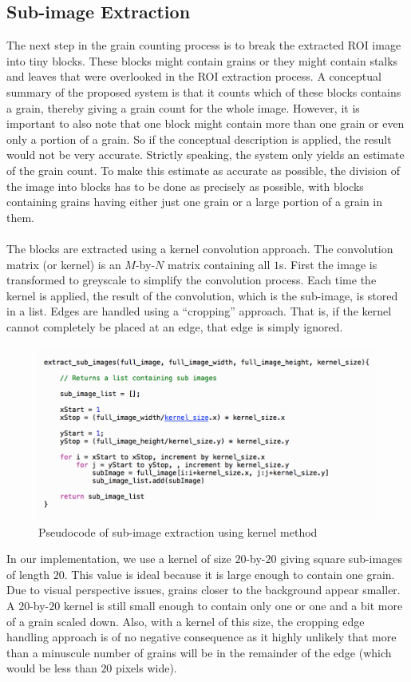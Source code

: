 \subsection{Sub-image Extraction}
The next step in the grain counting process is to break the extracted ROI image into tiny blocks. These blocks might contain grains or they might contain stalks and leaves that were overlooked in the ROI extraction process. A conceptual summary of the proposed system is that it counts which of these blocks contains a grain, thereby giving a grain count for the whole image. However, it is important to also note that one block might contain more than one grain or even only a portion of a grain. So if the conceptual description is applied, the result would not be very accurate. Strictly speaking, the system only yields an estimate of the grain count. To make this estimate as accurate as possible, the division of the image into blocks has to be done as precisely as possible, with blocks containing grains having either just one grain or a large portion of a grain in them.\\ \\
%
The blocks are extracted using a kernel convolution approach. The convolution matrix (or kernel) is an $M$-by-$N$ matrix containing all $1$s. First the image is transformed to greyscale to simplify the convolution process. Each time the kernel is applied, the result of the convolution, which is the sub-image, is stored in a list. Edges are handled using a ``cropping'' approach. That is, if the kernel cannot completely be placed at an edge, that edge is simply ignored.
\begin{figure}[ht!]
\centering
\includegraphics[scale=0.6]{kernel}
\caption{Pseudocode of sub-image extraction using kernel method}
\label{fig1}
\end{figure}
In our implementation, we use a kernel of size $20$-by-$20$ giving square sub-images of length $20$. This value is ideal because it is large enough to contain one grain. Due to visual perspective issues, grains closer to the background appear smaller. A $20$-by-$20$ kernel is still small enough to contain only one or one and a bit more of a grain scaled down. Also, with a kernel of this size, the cropping edge handling approach is of no negative consequence as it highly unlikely that more than a minuscule number of grains will be in the remainder of the edge (which would be less than $20$ pixels wide).

